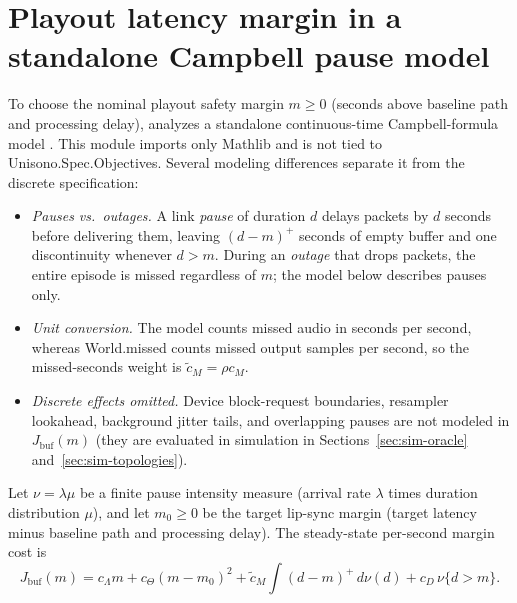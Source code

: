 \documentclass[11pt,a4paper]{article}
\DeclareRobustCommand{\lean}[1]{{\ttfamily\def\_{\textunderscore\allowbreak}#1}}
\theoremstyle{definition}
\begin{document}
\section{Playout latency margin in a standalone Campbell pause model}
\label{sec:level}

To choose the nominal playout safety margin $m \ge 0$ (seconds above baseline
path and processing delay),  analyzes a
standalone continuous-time Campbell-formula model \cite{kingman1993}.
This module imports only Mathlib and is not tied to
\lean{Unisono.Spec.Objectives}. Several modeling differences separate it from
the discrete specification:
\begin{itemize}
\item \emph{Pauses vs.\ outages.} A link \emph{pause} of duration $d$ delays
  packets by $d$ seconds before delivering them, leaving $(d - m)^+$ seconds of
  empty buffer and one discontinuity whenever $d > m$. During an \emph{outage}
  that drops packets, the entire episode is missed regardless of $m$; the model
  below describes pauses only.
\item \emph{Unit conversion.} The model counts missed audio in seconds per
  second, whereas \lean{World.missed} counts missed output samples per second,
  so the missed-seconds weight is $\tilde c_M = \rho c_M$.
\item \emph{Discrete effects omitted.} Device block-request boundaries,
  resampler lookahead, background jitter tails, and overlapping pauses are not
  modeled in $J_{\mathrm{buf}}(m)$ (they are evaluated in simulation in
  Sections~\ref{sec:sim-oracle} and~\ref{sec:sim-topologies}).
\end{itemize}

Let $\nu = \lambda\mu$ be a finite pause intensity measure (arrival rate
$\lambda$ times duration distribution $\mu$), and let $m_0 \ge 0$ be the target
lip-sync margin (target latency minus baseline path and processing delay). The
steady-state per-second margin cost is
\[
  J_{\mathrm{buf}}(m) = c_\Lambda m + c_\Theta (m - m_0)^2
       + \tilde c_M \int (d - m)^+\,d\nu(d)
       + c_D\,\nu\{d > m\} .
\]
\end{document}
